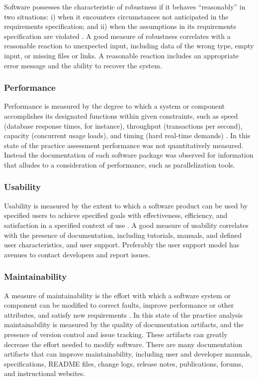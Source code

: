 \documentclass[12pt, notitlepage]{article}
\begin{document}
Software possesses the characteristic of robustness if it behaves “reasonably” in two situations: i) when it encounters circumstances not anticipated in the requirements specification; and ii) when the assumptions in its requirements specification are violated \citep{boehm2007software} \citep{ghezzi1991fundamentals}. A good measure of robustness correlates with a reasonable reaction to unexpected input, including data of the wrong type, empty input, or missing files or links. A reasonable reaction includes an appropriate error message and the ability to recover the system.

\subsubsection{Performance}

Performance is measured by the degree to which a system or component accomplishes its designated functions within given constraints, such as speed (database response times, for instance), throughput (transactions per second), capacity (concurrent usage loads), and timing (hard real-time demands) \citep{IEEEStdGlossarySET1990} \citep{wiegers2003softreq}. In this state of the practice assessment performance was not quantitatively measured. Instead the documentation of each software package was observed for information that alludes to a consideration of performance, such as parallelization tools. 

\subsubsection{Usability}

Usability is measured by the extent to which a software product can be used by specified users to achieve specified goals with effectiveness, efficiency, and satisfaction in a specified context of use \citep{nielsonusability}. A good measure of usability correlates with the presence of documentation, including tutorials, manuals, and defined user characteristics, and user support. Preferably the user support model has avenues to contact developers and report issues.

\subsubsection{Maintainability}

A measure of maintainability is the effort with which a software
system or component can be modified to correct faults, improve performance or other attributes, and satisfy new requirements \citep{IEEEStdGlossarySET1990} \citep{boehm2007software}. In this state of the practice analysis maintainability is measured by the quality of documentation artifacts, and the presence of version control and issue tracking. These artifacts can greatly decrease the effort needed to modify software. There are many documentation artifacts that can improve maintainability, including user and developer manuals, specifications, README files, change logs, release notes, publications, forums, and instructional websites. 
\end{document}
